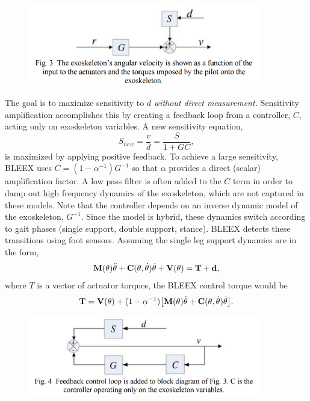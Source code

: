 \begin{figure}[ht]
  \centering
  \includegraphics[width=4.0in]{exos/figs/bleex_control_diag_1.png}
\end{figure}

The goal is to maximize sensitivity to $d$ \emph{without direct measurement.}  Sensitivity amplification accomplishes this by creating a feedback loop from a controller, $C$, acting only on exoskeleton variables.  A new sensitivity equation,
\[S_{new} = \frac{v}{d} = \frac{S}{1 + G C} ,\]
is maximized by applying positive feedback.  To achieve a large sensitivity, BLEEX uses $C = (1-\alpha^{-1})G^{-1}$ so that $\alpha$ provides a direct (scalar) amplification factor. A low pass filter is often added to the $C$ term in order to damp out high frequency dynamics of the exoskeleton, which are not captured in these models.  Note that the controller depends on an inverse dynamic model of the exoskeleton, $G^{-1}$.  Since the model is hybrid, these dynamics switch according to gait phases (single support, double support, stance).  BLEEX detects these transitions using foot sensors.  Assuming the single leg support dynamics are in the form,
\begin{equation}
{\bf M}({\bf\theta})\ddot{{\bf \theta}} + {\bf C}({\bf\theta},\dot{{\bf\theta}}) \dot{{\bf \theta}} + {\bf V}({\bf\theta}) = {\bf T} + {\bf d} ,
\end{equation}
where $T$ is a vector of actuator torques, the BLEEX control torque would be
\begin{equation}
{\bf T} = {\bf V}({\bf\theta}) + (1 - \alpha^{-1}) \big [ {\bf M}({\bf\theta})\ddot{{\bf \theta}} + {\bf C}({\bf\theta},\dot{{\bf\theta}}) \dot{{\bf \theta}} \big ] .
\end{equation}

\begin{figure}[ht]
  \centering
  \includegraphics[width=4.0in]{exos/figs/bleex_control_diag_2.png}
\end{figure}

